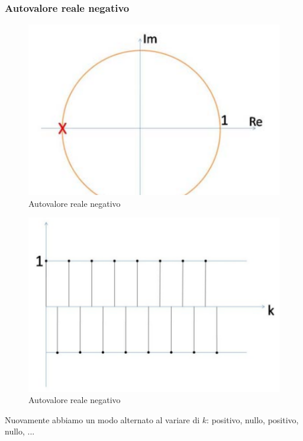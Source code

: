\documentclass[a4paper]{report}
\begin{document}
\subsubsection{Autovalore reale negativo}
\begin{figure}[!h]
  \begin{center}
    \includegraphics[scale=0.3]{./figures/autovaloreRealeNegativoCirconferenza00.png}
    \caption{Autovalore reale
      negativo}\label{fig:autovaloreRealeNegativoCirconferenza00.png} 
  \end{center}
\end{figure}
\begin{figure}[!h]
  \begin{center}
    \includegraphics[scale=0.3]{./figures/autovaloreRealeNegativoCirconferenza01.png}
    \caption{Autovalore reale
      negativo}\label{fig:autovaloreRealeNegativoCirconferenza01.png} 
  \end{center}
\end{figure}
Nuovamente abbiamo un modo alternato al variare di $k$: positivo,
nullo, positivo, nullo, ...
\end{document}
